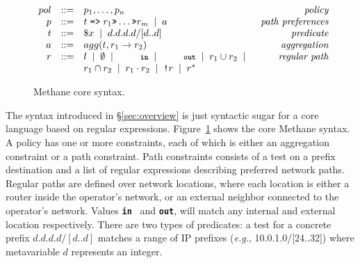 \documentclass[numbers, 10pt, preprint]{sigplanconf}
\newcommand{\EG}{\emph{e.g.}}
\newcommand{\sysname}{{\small \sf Methane}\xspace}
\newcommand{\KW}[1]{\texttt{\small\bfseries{#1}}}
\newcommand{\Prefer}{\texttt{>>}}
\newcommand{\Path}{\texttt{=>}}
\newcommand{\In}{\KW{in}}
\newcommand{\Out}{\KW{out}}
\newcommand{\NOT}{\texttt{!}}
\newcommand{\BNFALT}{\;\;|\;\;}
\begin{document}
\begin{figure}[t]\small
  \begin{minipage}[t]{\linewidth}
  \vspace*{-1\baselineskip}
  \[ \begin{array}{rclr}
     pol     &::=& p_1, \dots, p_n & \textit{policy} \\
     p       &::=& t \hspace{.3em} \Path \hspace{.3em} r_1 \Prefer \dots \Prefer r_m \BNFALT a & \textit{path preferences}  \\
     t       &::=& \$x \BNFALT d.d.d.d/[d..d] \hspace{1.5em} & \textit{predicate} \\
     a      &::=& agg(t, r_1 \rightarrow r_2) & \textit{aggregation} \\
     r       &::=& l \BNFALT \emptyset \BNFALT \In \BNFALT \Out \BNFALT r_1 \cup r_2 \BNFALT & \textit{regular path} \\
             &   & r_1 \cap r_2 \BNFALT r_1 \cdot r_2 \BNFALT \NOT r \BNFALT r^* \\
  \end{array} \]%

  \end{minipage}
  \vspace{-.3em}
  \caption{\sysname core syntax.}
  \label{fig:syntax}
\end{figure}%

The syntax introduced in \S\ref{sec:overview} is just syntactic sugar for a core language based on regular expressions. Figure~\ref{fig:syntax} shows the core \sysname syntax.
%
A policy has one or more constraints, each of which is either an aggregation constraint or a path constraint. Path constraints consists of a test on a prefix destination and a list of regular expressions describing preferred network paths. Regular paths are defined over network locations, where each location is either a router inside the operator's network, or an external neighbor connected to the operator's network. Values \In~ and \Out, will match any internal and external location respectively. There are two types of predicates: a test for a concrete prefix $d.d.d.d/[d..d]$ matches a range of IP prefixes (\EG, 10.0.1.0/[24..32]) where metavariable $d$ represents an integer.
\end{document}
